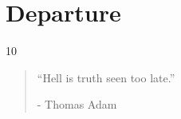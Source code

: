 \chapter{Departure} %

\vspace{-1.3cm}
\begin{localsize}{10}
    \begin{quote}
        “Hell is truth seen too late.”
        \begin{flushright}- Thomas Adam \end{flushright}
    \end{quote}
\end{localsize}
\vspace{1cm}